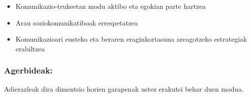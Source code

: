 \documentclass[
]{book}
\providecommand{\tightlist}{%
  \setlength{\itemsep}{0pt}\setlength{\parskip}{0pt}}
\begin{document}
\begin{itemize}
  \begin{itemize}
  \tightlist
  \item
    Komunikazio-trukeetan modu aktibo eta egokian parte hartzea
  \item
    Arau soziokomunikatiboak errespetatzea
  \item
    Komunikazioari eusteko eta beraren eraginkortasuna areagotzeko estrategiak erabiltzea
  \end{itemize}
\end{itemize}

\hypertarget{agerbideak}{%
\subsubsection{Agerbideak:}\label{agerbideak}}

Adierazleak dira dimentsio horien garapenak ustez erakutsi behar duen modua.
\end{document}
